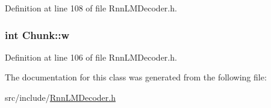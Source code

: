 Definition at line 108 of file Rnn\+L\+M\+Decoder.\+h.

\subsubsection[{w}]{\setlength{\rightskip}{0pt plus 5cm}int Chunk\+::w}\hypertarget{class_chunk_a71c41b04da01724dd3ab3899f51beb2e}{}\label{class_chunk_a71c41b04da01724dd3ab3899f51beb2e}


Definition at line 106 of file Rnn\+L\+M\+Decoder.\+h.



The documentation for this class was generated from the following file\+:\begin{DoxyCompactItemize}
\item 
src/include/\hyperlink{_rnn_l_m_decoder_8h}{Rnn\+L\+M\+Decoder.\+h}\end{DoxyCompactItemize}
